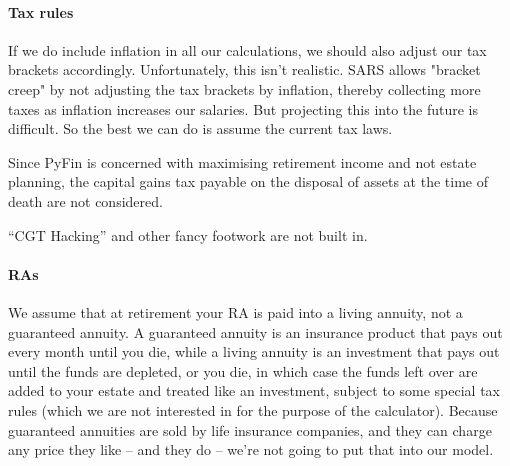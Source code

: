 \documentclass[a4paper, justified]{tufte-handout}
\begin{document}
\paragraph{Tax rules} \label{tax rules}
If we do include inflation in all our calculations, we should also adjust our tax brackets accordingly. Unfortunately, this isn't realistic. SARS allows "bracket creep" by not adjusting the tax brackets by inflation, thereby collecting more taxes as inflation increases our salaries. But projecting this into the future is difficult. So the best we can do is assume the current tax laws.

Since PyFin is concerned with maximising retirement income and not estate planning, the capital gains tax payable on the disposal of assets at the time of death are not considered.

``CGT Hacking'' and other fancy footwork are not built in.

\paragraph{RAs}
We assume that at retirement your RA is paid into a living annuity, not a guaranteed annuity. A guaranteed annuity is an insurance product that pays out every month until you die, while a living annuity is an investment that pays out until the funds are depleted, or you die, in which case the funds left over are added to your estate and treated like an investment, subject to some special tax rules (which we are not interested in for the purpose of the calculator). Because guaranteed annuities are sold by life insurance companies, and they can charge any price they like -- and they do -- we're not going to put that into our model.
\end{document}
